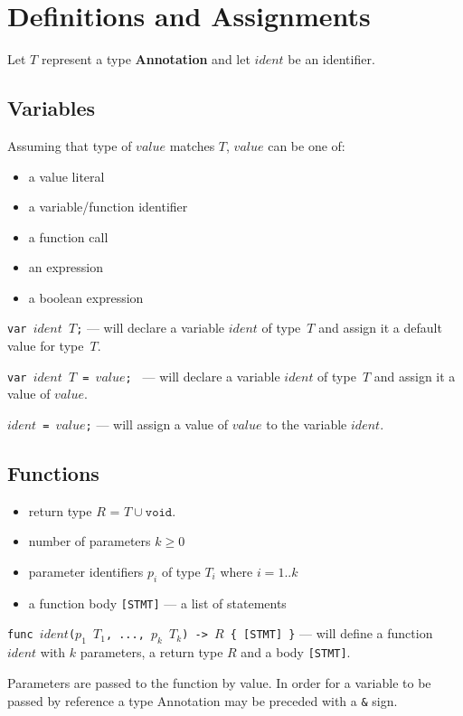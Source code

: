\documentclass{article}
\begin{document}
\section{Definitions and Assignments}
Let $T$ represent a type \textbf{Annotation} and let $ident$ be an identifier.

\subsection{Variables}
Assuming that type of $value$ matches $T$, $value$ can be one of:
\begin{itemize}
  \setlength\itemsep{.1em}
  \item a value literal
  \item a variable/function identifier
  \item a function call
  \item an expression
  \item a boolean expression
\end{itemize}

\texttt{var $ident$ $T$;} --- will declare a variable $ident$ of type~$T$ and
assign it a default value for type~$T$.

\texttt{var $ident$ $T$ = $value$; } --- will declare a variable $ident$ of
type~$T$ and assign it a value of $value$.

\texttt{$ident$ = $value$;} --- will assign a value of $value$ to the variable
$ident$.

\subsection{Functions}
\label{def-functions}
\begin{itemize}
  \setlength\itemsep{.1em}
  \item return type $R$ = $T \cup { \texttt{void} }$.
  \item number of parameters $k \geq 0$
  \item parameter identifiers $p_i$ of type $T_i$ where $i = 1..k$
  \item a function body \texttt{[STMT]} --- a list of statements
\end{itemize}

\texttt{func $ident$($p_1$ $T_1$, ..., $p_k$ $T_k$) -> $R$ \{ [STMT] \}} --- will
define a function $ident$ with $k$ parameters, a return type $R$ and a body
\texttt{[STMT]}.

Parameters are passed to the function by value. In order for a variable to be
passed by reference a type Annotation may be preceded with a \texttt{\&} sign.
\end{document}
